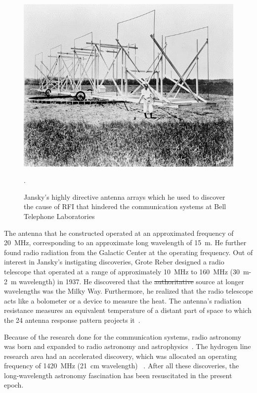 \begin{figure}
	\begin{center}
		\includegraphics[width=0.7\linewidth]{Figures/jansky1.jpg}
		\caption{Jansky's highly directive antenna arrays which he used to discover the cause of RFI that hindered the communication systems at Bell Telephone Laboratories~\citep{book:BasicsofRA}}.
		\label{Fig:Jansky}
	\end{center}
\end{figure}

The antenna that he constructed operated at an approximated frequency of \SI{20}{MHz}, corresponding to an approximate long wavelength of \SI{15}{m}. He further found radio radiation from the Galactic Center at the operating frequency. Out of interest in Jansky's instigating discoveries, Grote Reber designed a radio telescope that operated at a range of approximately \SI{10}{MHz} to \SI{160}{MHz} (\SI{30}{m}-\SI{2}{m} wavelength) in 1937. He discovered that the \st{authoritative}  source at longer wavelengths was the Milky Way. Furthermore, he realized that the radio telescope acts like a bolometer or a device to measure the heat. The antenna's radiation resistance measures an equivalent temperature of a distant part of space to which the 24 antenna response pattern projects it~\citep{1988JRASC..82...93R, CosmicStatic,2012PASP..124.1090H}.

Because of the research done for the communication systems, radio astronomy was born and expanded to radio astronomy and astrophysics~\citep{2012PASP..124.1090H}. The hydrogen line research area had an accelerated discovery, which was allocated an operating frequency of \SI{1420}{MHz} (\SI{21}{cm} wavelength) ~\citep{10.2307/530765}. After all these discoveries, the long-wavelength astronomy fascination has been resuscitated in the present epoch.

